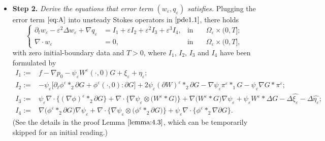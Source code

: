 \documentclass[13pt,CJK]{article}
\theoremstyle{plain}                       %
\theoremstyle{remark}
\numberwithin{equation}{section}
\begin{document}
\begin{itemize}
\begin{itemize}
 \item  \textbf{Step 2.}  \emph{Derive the equations that error term $(w_\varepsilon,q_\varepsilon)$ satisfies.}
Plugging the error term $\eqref{eq:A}$
into unsteady Stokes operators in $\eqref{pde1.1}$, there holds
\begin{equation}\label{pde:A}
\left\{
\begin{aligned}
\partial_t w_{\varepsilon}
-\varepsilon^2\Delta w_{\varepsilon}+\nabla q_{\varepsilon}&=I_1+\varepsilon I_2+\varepsilon^2I_3+\varepsilon^3 I_4,&\text{in}&\quad\Omega_{\varepsilon}\times(0,T];\\
\nabla\cdot w_{\varepsilon}&=0,&\text{in}&\quad
\Omega_{\varepsilon}\times(0,T],
\end{aligned}
\right.
\end{equation}
with zero initial-boundary data and $T>0$,
where $I_1$, $I_2$, $I_3$ and $I_4$ have been formulated by
\begin{equation*}
\begin{aligned}
I_1:=&f-\nabla p_0-\psi_{\varepsilon}W^{\varepsilon}(\cdot,0)G
+\xi_{\varepsilon}+\eta_{\varepsilon};\\
I_2:=&-\psi_{\varepsilon}
\Big[
\partial_t\phi^{\varepsilon}\ast_2\partial G+
\phi^{\varepsilon}(\cdot,0):\partial G
\Big]+2\psi_{\varepsilon}(\partial W)^{\varepsilon}\ast_2\partial G
-
\nabla\psi_{\varepsilon}
\pi^{\varepsilon}\ast_1 G
-\psi_{\varepsilon}\nabla G\ast\pi^{\varepsilon};\\
I_3:=&\psi_{\varepsilon}
\nabla\cdot
\Big\{
(\nabla\phi)^{\varepsilon}\ast_2\partial G
\Big\}
+\nabla\cdot
\Big\{
\nabla\psi_{\varepsilon}\otimes \big(W^{\varepsilon}\ast G\big)
\Big\}
+\nabla\big(W^{\varepsilon}\ast G\big)\nabla
\psi_{\varepsilon}
+\psi_{\varepsilon} W^{\varepsilon}\ast\Delta G
-\Delta\hat{\xi_{\varepsilon}}
-\Delta\hat{\eta_{\varepsilon}};\\
I_4:=&\nabla
\big(\phi^{\varepsilon}\ast_2\partial G\big)\nabla\psi_{\varepsilon}+
\nabla\cdot\Big\{
\nabla\psi_{\varepsilon}\otimes
\big(\phi^{\varepsilon}\ast_2\partial G\big)
\Big\}
+\psi_{\varepsilon}
\nabla\cdot\Big\{\phi^{\varepsilon}\ast_2\nabla\partial G\Big\}.
\end{aligned}
\end{equation*}
(See the details in the proof Lemma $\ref{lemma:4.3}$, which can be temporarily skipped for an initial reading.)


\end{itemize}
\end{itemize}
\end{document}
